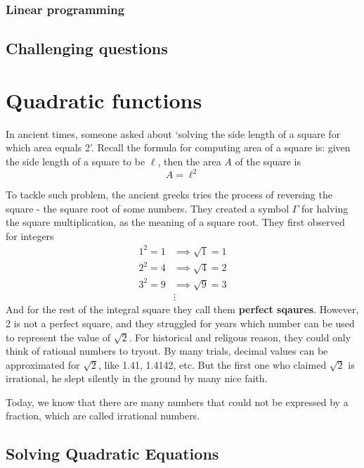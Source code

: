 \documentclass[12pt]{article}
\begin{document}
    \subsubsection*{Linear programming}

    \subsection{Challenging questions}

    \newpage

    \section{Quadratic functions}

    In ancient times, someone asked about `solving the side length of a square for which area equals 2'. Recall the formula for computing area of a square is: given the side length of a square to be $\ell$, then the area $A$ of the square is \[A=\ell^2\]

    To tackle such problem, the ancient greeks tries the process of reversing the square - the square root of some numbers. They created a symbol \(\Gamma\) for halving the square multiplication, as the meaning of a square root. They first observed for integers \begin{align*}
        1^2=1 &\implies \sqrt{1} = 1\\
        2^2=4 &\implies \sqrt{4} = 2\\
        3^2=9 &\implies \sqrt{9} = 3\\
        &\vdots
    \end{align*}
    And for the rest of the integral square they call them \textbf{perfect sqaures}. However, 2 is not a perfect square, and they struggled for years which number can be used to represent the value of \(\sqrt{2}\). For historical and religous reason, they could only think of rational numbers to tryout. By many trials, decimal values can be approximated for \(\sqrt{2}\), like 1.41, 1.4142, etc. But the first one who claimed \(\sqrt{2}\) is irrational, he slept silently in the ground by many nice faith.

    Today, we know that there are many numbers that could not be expressed by a fraction, which are called irrational numbers.

    \subsection{Solving Quadratic Equations}
\end{document}
